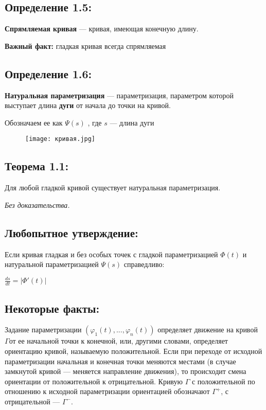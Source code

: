 \documentclass[12pt]{article}
\begin{document}
\subsection*{Определение 1.5:}
\begin{flushleft}
\textbf{Спрямляемая кривая} — кривая, имеющая конечную длину.

\textbf{Важный факт:} гладкая кривая всегда спрямляемая

\end{flushleft}
\subsection*{Определение 1.6:}
\begin{flushleft}
\textbf{Натуральная параметризация} — параметризация, параметром которой выступает длина \textbf{дуги} от начала до точки на кривой.

Обозначаем ее как $\Psi(s)$ , где $s$ — длина дуги
\end{flushleft}
\begin{figure}[h]
\centering
\texttt{[image: кривая.jpg]}
\end{figure}

\subsection*{Теорема 1.1:}
	Для любой гладкой кривой существует натуральная параметризация.
	
	\textit{Без доказательства.}
	
\subsection*{Любопытное утверждение:}
Если кривая гладкая и без особых точек с гладкой параметризацией 
$\Phi(t)$ и натуральной параметризацией $\Psi(s)$ справедливо:
\begin{center}
$\frac{ds}{dt} = |\Phi'(t)|$
\end{center}
\subsection*{Некоторые факты:}
Задание параметризации $(\varphi_1(t), ... , \varphi_n(t))$ определяет движение на кривой $\Gamma $от ее начальной точки к конечной, или, другими словами, определяет ориентацию кривой, называемую положительной. Если при переходе от исходной параметризации начальная и конечная точки меняются местами (в случае замкнутой кривой — меняется направление движения), то происходит смена ориентации от положительной к отрицательной. Кривую $\Gamma$ с положительной по отношению к исходной параметризации ориентацией обозначают $\Gamma^+$, с отрицательной — $\Gamma^-$.
\end{document}
